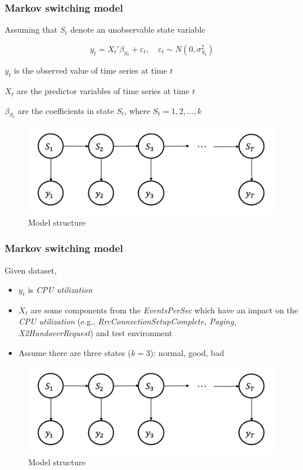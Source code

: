 \documentclass{beamer}
\begin{document}
\begin{frame}
\frametitle{Markov switching model}
Assuming that $S_{t}$ denote an unobservable state variable

$$y_{t} = {X_{t}}'\beta_{S_{t}} + \varepsilon_{t}, \quad \varepsilon_{t} \sim N(0,\sigma^{2}_{S_{t}})$$

$y_{t}$ is the observed value of time series at time $t$ 

$X_{t}$ are the predictor variables of time series at time $t$ 

$\beta_{S_{t}}$ are the coefficients in state $S_{t}$, where $S_{t}=1,2,...,k$


\begin{figure}
	\includegraphics[width=0.5\linewidth]{msm}
	\caption{Model structure}
\end{figure}

\end{frame}


\begin{frame}
\frametitle{Markov switching model}

Given dataset,

\begin{itemize}
	\item $y_{t}$ is \textit{CPU utilization}
	\item$X_{t}$ are some components from the \textit{EventsPerSec} which have an impact on the \textit{CPU utilization} (e.g., \textit{RrcConnectionSetupComplete, Paging, X2HandoverRequest}) and test environment
	\item Assume there are three states ($k=3$): normal, good, bad
\end{itemize}

\begin{figure}
	\includegraphics[width=0.5\linewidth]{msm}
	\caption{Model structure}
\end{figure}

\end{frame}
\end{document}
